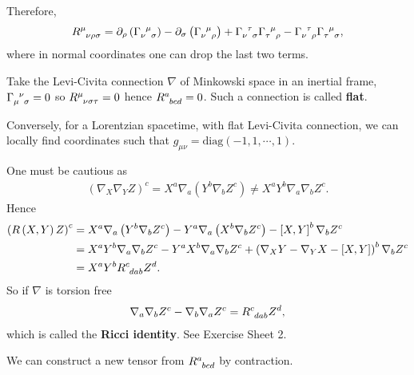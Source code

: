 Therefore,
\begin{align}
    \tensor{R}{^{\mu}_{\nu \rho \sigma}} = \partial_\rho \left( \tensor{\Gamma}{_{\nu}^{\mu}_{\sigma}} \right) - \partial_\sigma \left( \tensor{\Gamma}{_{\nu}^{\mu}_{\rho}} \right) + \tensor{\Gamma}{_{\nu}^{\tau}_{\sigma}} \tensor{\Gamma}{_{\tau}^{\mu}_{\rho}} - \tensor{\Gamma}{_{\nu}^{\tau}_{\rho}} \tensor{\Gamma}{_{\tau}^{\mu}_{\sigma}} 
,\end{align}
where in normal coordinates one can drop the last two terms.

\begin{example}
    Take the Levi-Civita connection $\nabla$ of Minkowski space in an inertial frame, $\tensor{\Gamma}{_{\mu}^{\nu}_\sigma} = 0$ so $\tensor{R}{^{\mu}_{\nu \sigma \tau}} = 0$ hence $\tensor{R}{^{a}_{bcd}} = 0$. Such a connection is called \textbf{flat}.

    Conversely, for a Lorentzian spacetime, with flat Levi-Civita connection, we can locally find coordinates such that $g_{\mu \nu} = \text{diag}\left( -1,1,\cdots,1 \right) $.
\end{example}

\begin{note}
    One must be cautious as
    \begin{align}
        \left( \nabla_X \nabla_Y Z \right)^{c} = X^{a} \nabla_a \left( Y^{b} \nabla_b Z^{c} \right) \neq X^{a} Y^{b} \nabla_a \nabla_b Z^{c}
    .\end{align}
    Hence
    \begin{align}
        \left( R \left( X,Y \right) Z \right)^{c} &= X^{a} \nabla_a \left( Y^{b} \nabla_b Z^{c} \right) - Y^{a} \nabla_a \left( X^{b} \nabla_b Z^{c} \right) - \left[ X, Y \right]^{b} \nabla_b Z^{c} \\
        &= X^{a} Y^{b} \nabla_a \nabla_b Z^{c} - Y^{a} X^{b} \nabla_a \nabla_b Z^{c} + \left( \nabla_X Y - \nabla_Y X - \left[ X, Y \right]  \right)^{b} \nabla_b Z^{c} \\
        &= X^{a} Y^{b} \tensor{R}{^{c}_{dab}} Z^{d}
    .\end{align}
    So if $\nabla$ is torsion free
    \begin{align}
        \nabla_a \nabla_b Z^{c} - \nabla_b \nabla_a Z^{c} = \tensor{R}{^{c}_{dab}} Z^{d}
    ,\end{align}
    which is called the \textbf{Ricci identity}.
    See Exercise Sheet 2.
\end{note}


We can construct a new tensor from $\tensor{R}{^{a}_{bcd}}$ by contraction.


